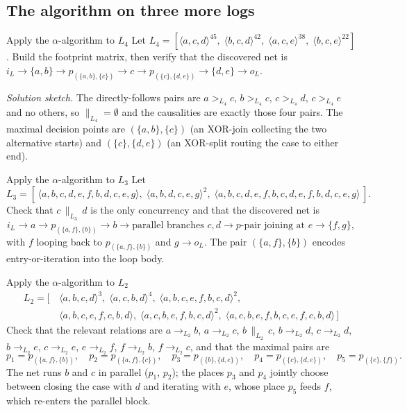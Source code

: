 \subsection{The algorithm on three more logs}

\begin{examplebox}{Apply the $\alpha$-algorithm to $L_4$}
Let $L_4 = [\langle a, c, d\rangle^{45},\;\langle b, c, d\rangle^{42},\;\langle a, c, e\rangle^{38},\;\langle b, c, e\rangle^{22}]$. Build the footprint matrix, then verify that the discovered net is $i_L \to \{a, b\} \to p_{(\{a, b\}, \{c\})} \to c \to p_{(\{c\}, \{d, e\})} \to \{d, e\} \to o_L$.
\end{examplebox}

\textit{Solution sketch.} The directly-follows pairs are $a >_{L_4} c$, $b >_{L_4} c$, $c >_{L_4} d$, $c >_{L_4} e$ and no others, so $\|_{L_4} = \emptyset$ and the causalities are exactly those four pairs. The maximal decision points are $(\{a, b\}, \{c\})$ (an XOR-join collecting the two alternative starts) and $(\{c\}, \{d, e\})$ (an XOR-split routing the case to either end).

\begin{examplebox}{Apply the $\alpha$-algorithm to $L_3$}
Let
\[
  L_3 = [\,\langle a, b, c, d, e, f, b, d, c, e, g\rangle,\;\langle a, b, d, c, e, g\rangle^2,\;\langle a, b, c, d, e, f, b, c, d, e, f, b, d, c, e, g\rangle\,].
\]
Check that $c \,\|_{L_3}\, d$ is the only concurrency and that the discovered net is
\[
  i_L \to a \to p_{(\{a, f\}, \{b\})} \to b \to \text{parallel branches } c, d \to p\text{-pair joining at } e \to \{f, g\},
\]
with $f$ looping back to $p_{(\{a, f\}, \{b\})}$ and $g \to o_L$. The pair $(\{a, f\}, \{b\})$ encodes entry-or-iteration into the loop body.
\end{examplebox}

\begin{examplebox}{Apply the $\alpha$-algorithm to $L_2$}
\[
\begin{aligned}
L_2 = [\,&\langle a, b, c, d\rangle^3,\;\langle a, c, b, d\rangle^4,\;\langle a, b, c, e, f, b, c, d\rangle^2,\;\\
         &\langle a, b, c, e, f, c, b, d\rangle,\;\langle a, c, b, e, f, b, c, d\rangle^2,\;\langle a, c, b, e, f, b, c, e, f, c, b, d\rangle\,]
\end{aligned}
\]
Check that the relevant relations are $a \to_{L_2} b$, $a \to_{L_2} c$, $b \,\|_{L_2}\, c$, $b \to_{L_2} d$, $c \to_{L_2} d$, $b \to_{L_2} e$, $c \to_{L_2} e$, $e \to_{L_2} f$, $f \to_{L_2} b$, $f \to_{L_2} c$, and that the maximal pairs are
\[
  p_1 = p_{(\{a, f\}, \{b\})},\quad p_2 = p_{(\{a, f\}, \{c\})},\quad p_3 = p_{(\{b\}, \{d, e\})},\quad p_4 = p_{(\{c\}, \{d, e\})},\quad p_5 = p_{(\{e\}, \{f\})}.
\]
The net runs $b$ and $c$ in parallel ($p_1$, $p_2$); the places $p_3$ and $p_4$ jointly choose between closing the case with $d$ and iterating with $e$, whose place $p_5$ feeds $f$, which re-enters the parallel block.
\end{examplebox}


